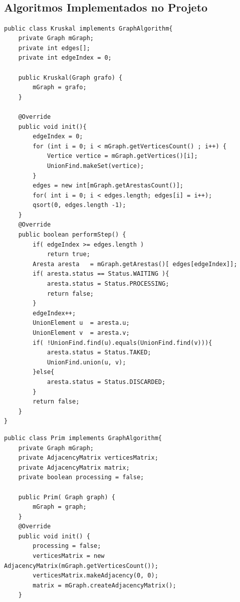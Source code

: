 \documentclass[a4paper,12pt]{article}
\begin{document}
\appendix
\begin{appendices}
\section{\\Algoritmos Implementados no Projeto} \label{App:AppendixA}

\begin{lstlisting}[label=figura,title=Implementação do Algoritmo de Kruskal em Java]
public class Kruskal implements GraphAlgorithm{
	private Graph mGraph;
	private int edges[];
	private int edgeIndex = 0;
	
	public Kruskal(Graph grafo) {
		mGraph = grafo;
	}	

	@Override
	public void init(){
		edgeIndex = 0;
		for (int i = 0; i < mGraph.getVerticesCount() ; i++) {
			Vertice vertice = mGraph.getVertices()[i];
			UnionFind.makeSet(vertice);
		}
		edges = new int[mGraph.getArestasCount()];
		for( int i = 0; i < edges.length; edges[i] = i++);
		qsort(0, edges.length -1);
	}
	@Override
	public boolean performStep() {
		if( edgeIndex >= edges.length )
			return true;
		Aresta aresta 	= mGraph.getArestas()[ edges[edgeIndex]];
		if( aresta.status == Status.WAITING ){
			aresta.status = Status.PROCESSING;
			return false;
		}
		edgeIndex++;
		UnionElement u 	= aresta.u;
		UnionElement v 	= aresta.v;
		if( !UnionFind.find(u).equals(UnionFind.find(v))){
			aresta.status = Status.TAKED;
			UnionFind.union(u, v);
		}else{
			aresta.status = Status.DISCARDED;
		}
		return false;
	}
}
\end{lstlisting}

\begin{lstlisting}[title=Implementação do Algoritmo de Prims em Java]
public class Prim implements GraphAlgorithm{
	private Graph mGraph;
	private AdjacencyMatrix verticesMatrix;
	private AdjacencyMatrix matrix;
	private boolean processing = false;

	public Prim( Graph graph) {
		mGraph = graph;
	}
	@Override
	public void init() {
		processing = false;
		verticesMatrix = new AdjacencyMatrix(mGraph.getVerticesCount());
		verticesMatrix.makeAdjacency(0, 0);
		matrix = mGraph.createAdjacencyMatrix();
	}


\end{lstlisting}
\end{appendices}
\end{document}
